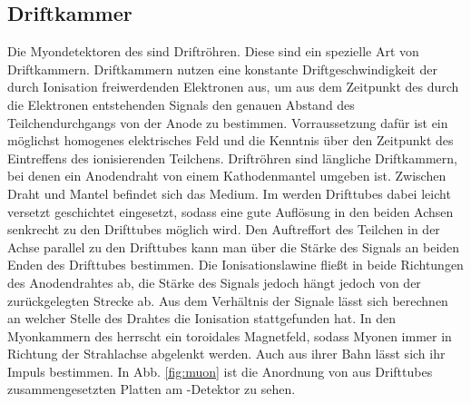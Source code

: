 \subsection{Driftkammer}\label{sec:drift}
Die Myondetektoren des \atlas sind Driftröhren. Diese sind ein spezielle Art von Driftkammern. 
Driftkammern nutzen eine konstante Driftgeschwindigkeit der durch Ionisation freiwerdenden Elektronen aus, um aus dem Zeitpunkt des durch die Elektronen entstehenden Signals den genauen Abstand des Teilchendurchgangs von der Anode zu bestimmen. Vorraussetzung dafür ist ein möglichst homogenes elektrisches Feld und die Kenntnis über den Zeitpunkt des Eintreffens des ionisierenden Teilchens.  
Driftröhren sind längliche Driftkammern, bei denen ein Anodendraht von einem Kathodenmantel umgeben ist. Zwischen Draht und Mantel befindet sich das Medium. 
Im \atlas werden Drifttubes dabei leicht versetzt geschichtet eingesetzt, sodass eine gute Auflösung in den beiden Achsen senkrecht zu den Drifttubes möglich wird\cite{2010EPJC...70..875A}. Den Auftreffort des Teilchen in der Achse parallel zu den Drifttubes kann man über die Stärke des Signals an beiden Enden des Drifttubes bestimmen. Die Ionisationslawine fließt in beide Richtungen des Anodendrahtes ab, die Stärke des Signals jedoch hängt jedoch von der zurückgelegten Strecke ab. Aus dem Verhältnis der Signale lässt sich berechnen an welcher Stelle des Drahtes die Ionisation stattgefunden hat.
In den Myonkammern des \atlas herrscht ein toroidales Magnetfeld, sodass Myonen immer in Richtung der Strahlachse abgelenkt werden\cite{2010EPJC...70..875A}. Auch aus ihrer Bahn lässt sich ihr Impuls bestimmen. In Abb. \ref{fig:muon} ist die Anordnung von aus Drifttubes zusammengesetzten Platten am \atlas-Detektor zu sehen.

